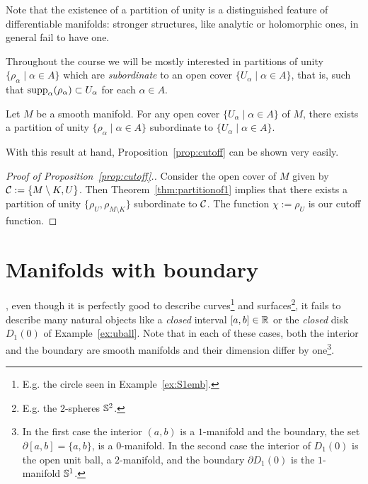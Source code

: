 \begin{remark}
  Note that the existence of a partition of unity is a distinguished feature of differentiable manifolds: stronger structures, like analytic or holomorphic ones, in general fail to have one.
\end{remark}

Throughout the course we will be mostly interested in partitions of unity $\{\rho_\alpha \mid \alpha\in A\}$ which are \emph{subordinate} to an open cover $\{U_\alpha\mid\alpha\in A\}$, that is, such that $\operatorname{supp}_\alpha(\rho_\alpha) \subset U_\alpha$ for each $\alpha\in A$.

\begin{theorem}\label{thm:partitionof1}
  Let $M$ be a smooth manifold. For any open cover $\{U_\alpha\mid\alpha\in A\}$ of $M$, there exists a partition of unity $\{\rho_\alpha \mid \alpha\in A\}$ subordinate to $\{U_\alpha\mid\alpha\in A\}$.
\end{theorem}

With this result at hand, Proposition~\ref{prop:cutoff} can be shown very easily.

\begin{proof}[Proof of Proposition~\ref{prop:cutoff}.]
  Consider the open cover of $M$ given by $\mathcal{C}:=\{M\setminus K, U\}$.
  Then Theorem~\ref{thm:partitionof1} implies that there exists a partition of unity $\{\rho_U, \rho_{M\setminus K}\}$ subordinate to $\mathcal{C}$. The function $\chi := \rho_U$ is our cutoff function.
\end{proof}

\section{Manifolds with boundary}\label{sec:mbnd}

, even though it is perfectly good to describe curves\footnote{E.g. the circle seen in Example~\ref{ex:S1emb}.} and surfaces\footnote{E.g. the $2$-spheres $\mathbb{S}^2$.}, it fails to describe many natural objects like a \emph{closed} interval $[a,b]\in\mathbb{R}$ or the \emph{closed} disk $D_1(0)$ of Example~\ref{ex:uball}.
Note that in each of these cases, both the interior and the boundary are smooth manifolds and their dimension differ by one\footnote{In the first case the interior $(a,b)$ is a $1$-manifold and the boundary, the set $\partial[a,b] = \{a,b\}$, is a $0$-manifold. In the second case the interior of $D_1(0)$ is the open unit ball, a $2$-manifold, and the boundary $\partial D_1(0)$ is the $1$-manifold $\mathbb{S}^1$.}.

